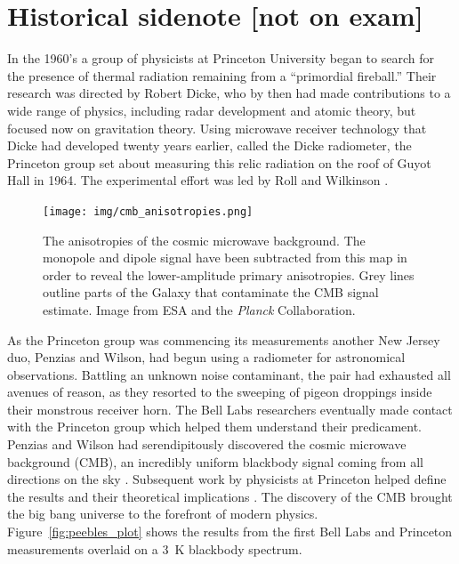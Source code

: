 \documentclass[a4paper,12pt]{article}
\theoremstyle{remark}
\renewcommand{\=}[1]{\stackrel{#1}{=}} %
\theoremstyle{plain}
\theoremstyle{definition}
\begin{document}
\section{Historical sidenote [not on exam]}
In the 1960's a group of physicists at Princeton University began to search for the presence of thermal radiation remaining from a ``primordial fireball.'' Their research was directed by Robert Dicke, who by then had made contributions to a wide range of physics, including radar development and atomic theory, but focused now on gravitation theory. Using microwave receiver technology that Dicke had developed twenty years earlier, called the Dicke radiometer, the Princeton group set about measuring this relic radiation on the roof of Guyot Hall in 1964. The experimental effort was led by Roll and Wilkinson \cite{FBB}. 

\begin{figure}[t]
\begin{center}
    \texttt{[image: img/cmb\_anisotropies.png]}
    \caption[CMB anisotropies]{The anisotropies of the cosmic microwave background. The monopole and dipole signal have been subtracted from this map in order to reveal the lower-amplitude primary anisotropies. Grey lines outline parts of the Galaxy that contaminate the CMB signal estimate. Image from ESA and the \textit{Planck} Collaboration.}
\label{fig:cmb_anisotropies}
\end{center}
\end{figure}

As the Princeton group was commencing its measurements another New Jersey duo, Penzias and Wilson, had begun using a radiometer for astronomical observations. Battling an unknown noise contaminant, the pair had exhausted all avenues of reason, as they resorted to the sweeping of pigeon droppings inside their monstrous receiver horn. The Bell Labs researchers eventually made contact with the Princeton group which helped them understand their predicament. Penzias and Wilson had serendipitously discovered the cosmic microwave background (CMB), an incredibly uniform blackbody signal coming from all directions on the sky \cite{Penzias1965}. Subsequent work by physicists at Princeton helped define the results and their theoretical implications \cite{Roll1966, Dicke1965}. The discovery of the CMB brought the big bang universe to the forefront of modern physics. Figure~\ref{fig:peebles_plot} shows the results from the first Bell Labs and Princeton measurements overlaid on a 3~K blackbody spectrum. 
\end{document}
